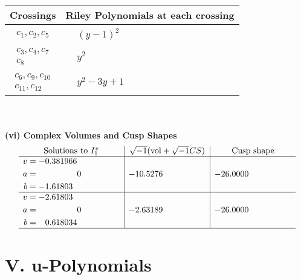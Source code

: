 \documentclass[1p]{elsarticle_modified}
\theoremstyle{definition}
\newcommand{\I}{\sqrt{-1}}
\begin{document}
\begin{tabular}{m{50pt}|m{274pt}}
Crossings & \hspace{64pt}Riley Polynomials at each crossing \\
\hline $$\begin{aligned}c_{1},c_{2},c_{5}\end{aligned}$$&$\begin{aligned}
&(y-1)^2
\end{aligned}$\\
\hline $$\begin{aligned}c_{3},c_{4},c_{7}\\c_{8}\end{aligned}$$&$\begin{aligned}
&y^2
\end{aligned}$\\
\hline $$\begin{aligned}c_{6},c_{9},c_{10}\\c_{11},c_{12}\end{aligned}$$&$\begin{aligned}
&y^2-3 y+1
\end{aligned}$\\
\hline
\end{tabular}\\~\\
\newpage\flushleft \textbf{(vi) Complex Volumes and Cusp Shapes}
$$\begin{array}{c|c|c}  
\text{Solutions to }I^v_{1}& \I (\text{vol} + \sqrt{-1}CS) & \text{Cusp shape}\\
 \hline 
\begin{aligned}
v &= -0.381966\phantom{ +0.000000I} \\
a &= \phantom{-0.000000 } 0 \\
b &= -1.61803\phantom{ +0.000000I}\end{aligned}
 & -10.5276\phantom{ +0.000000I} & -26.0000\phantom{ +0.000000I} \\ \hline\begin{aligned}
v &= -2.61803\phantom{ +0.000000I} \\
a &= \phantom{-0.000000 } 0 \\
b &= \phantom{-}0.618034\phantom{ +0.000000I}\end{aligned}
 & -2.63189\phantom{ +0.000000I} & -26.0000\phantom{ +0.000000I}\\
 \hline 
 \end{array}$$\newpage
\newpage\renewcommand{\arraystretch}{1}
\centering \section*{ V. u-Polynomials}
\end{document}
